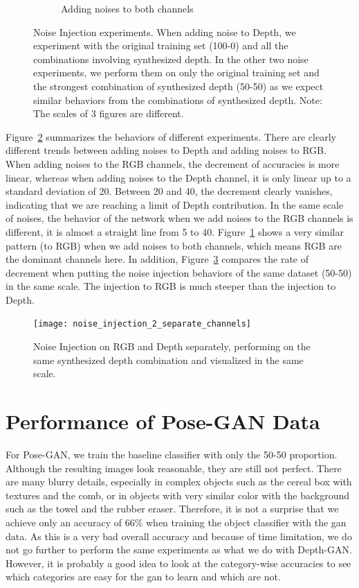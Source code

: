 \begin{figure}[h!]
\begin{subfigure}{0.32\textwidth}
		\caption{Adding noises to both channels}
		\label{subfig:noise_both}
	\end{subfigure}
	\caption{Noise Injection experiments. When adding noise to Depth, we experiment with
	the original training set (100-0) and all the combinations involving synthesized
depth. In the other two noise experiments, we perform them on only the original training
set and the strongest combination of synthesized depth (50-50) as we expect similar
behaviors from the combinations of synthesized depth. Note: The scales of 3 figures are
different.}
	\label{fig:noise_injection}
\end{figure}

Figure~\ref{fig:noise_injection} summarizes the behaviors of different experiments. There
are clearly different trends between adding noises to Depth and adding noises to RGB. When
adding noises to the RGB channels, the decrement of accuracies is more linear, whereas
when adding noises to the Depth channel, it is only linear up to a standard deviation of
20. Between 20 and 40, the decrement clearly vanishes, indicating that we are reaching a
limit of Depth contribution. In the same scale of noises, the behavior of the network when
we add noises to the RGB channels is different, it is almost a straight line from 5 to 40.
Figure~\ref{subfig:noise_both} shows a very similar pattern (to RGB) when we add noises to
both channels, which means RGB are the dominant channels here. In addition,
Figure~\ref{fig:noise_injection_2_channels} compares the rate of decrement when putting
the noise injection behaviors of the same dataset (50-50) in the same scale. The injection
to RGB is much steeper than the injection to Depth.

\begin{figure}[h!]
	\centering
	\texttt{[image: noise\_injection\_2\_separate\_channels]}
	\caption{Noise Injection on RGB and Depth separately, performing on the same
	synthesized depth combination and visualized in the same scale.}
	\label{fig:noise_injection_2_channels}
\end{figure}

\section{Performance of Pose-GAN Data \label{sec:performance_pose}}

For Pose-GAN, we train the baseline classifier with only the 50-50 proportion. Although
the resulting images look reasonable, they are still not perfect. There are many blurry
details, especially in complex objects such as the cereal box with textures and the comb,
or in objects with very similar color with the background such as the towel and the rubber
eraser. Therefore, it is not a surprise that we achieve only an accuracy of 66\% when
training the object classifier with the \acrshort{gan} data. As this is a very bad overall
accuracy and because of time limitation, we do not go further to perform the same
experiments as what we do with Depth-GAN. However, it is probably a good idea to look at
the category-wise accuracies to see which categories are easy for the \acrshort{gan} to learn
and which are not.

